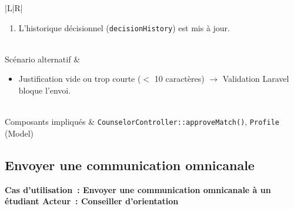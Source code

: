 \documentclass[a4paper,12pt]{article}
\newcommand{\ucheader}[2]{%
  \noindent\colorbox{capblue}{\parbox{\dimexpr\linewidth-2\fboxsep}{%
    \color{white}\bfseries\large Cas d'utilisation~: #1 \hfill \normalsize Acteur~: #2
  }}\\[2pt]
}
\begin{document}
\begin{tabular}{|L|R|}
\begin{enumerate}
  \item L'historique décisionnel (\texttt{decisionHistory}) est mis à jour.
\end{enumerate} \\
\hline
{}Scénario alternatif &
\begin{itemize}
  \item Justification vide ou trop courte ($<$ 10 caractères) $\rightarrow$ Validation Laravel bloque l'envoi.
\end{itemize} \\
\hline
Composants impliqués & \texttt{CounselorController::approveMatch()}, \texttt{Profile} (Model) \\
\hline
\end{tabular}

\vspace{1em}

\subsection{Envoyer une communication omnicanale}
\ucheader{Envoyer une communication omnicanale à un étudiant}{Conseiller d'orientation}
\end{document}
